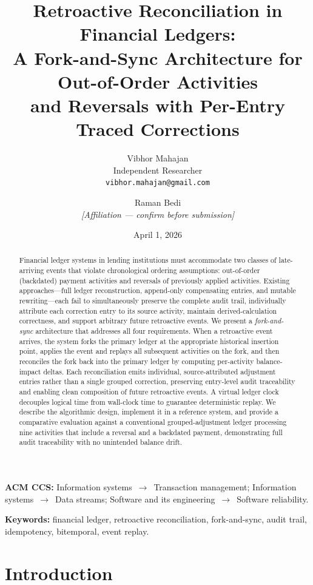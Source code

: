 \documentclass[11pt,letterpaper]{article}
\title{\textbf{Retroactive Reconciliation in Financial Ledgers:\\
A Fork-and-Sync Architecture for Out-of-Order Activities\\
and Reversals with Per-Entry Traced Corrections}}
\author{
  Vibhor Mahajan\\
  \small Independent Researcher\\
  \small \texttt{vibhor.mahajan@gmail.com}
  \and
  Raman Bedi\\
  \small \textit{[Affiliation — confirm before submission]}\\
}
\date{April 1, 2026}
\begin{document}
\maketitle

\begin{abstract}
Financial ledger systems in lending institutions must accommodate two
classes of late-arriving events that violate chronological ordering
assumptions: out-of-order (backdated) payment activities and reversals
of previously applied activities. Existing approaches---full ledger reconstruction, append-only
compensating entries, and mutable rewriting---each fail to
simultaneously preserve the complete audit trail, individually
attribute each correction entry to its source activity, maintain
derived-calculation correctness, and support arbitrary future
retroactive events. We present a \emph{fork-and-sync} architecture
that addresses all four requirements. When a retroactive
event arrives, the system forks the primary ledger at the appropriate
historical insertion point, applies the event and replays all subsequent
activities on the fork, and then reconciles the fork back into the
primary ledger by computing per-activity balance-impact deltas. Each
reconciliation emits individual, source-attributed adjustment entries
rather than a single grouped correction, preserving entry-level audit
traceability and enabling clean composition of future retroactive
events. A virtual ledger clock decouples logical time from wall-clock
time to guarantee deterministic replay. We describe the algorithmic
design, implement it in a reference system, and provide a comparative
evaluation against a conventional grouped-adjustment ledger processing
nine activities that include a reversal and a backdated payment,
demonstrating full audit traceability with no unintended balance drift.
\end{abstract}

\noindent\textbf{ACM CCS:} Information systems~$\to$~Transaction management;
Information systems~$\to$~Data streams;
Software and its engineering~$\to$~Software reliability.

\noindent\textbf{Keywords:} financial ledger, retroactive reconciliation,
fork-and-sync, audit trail, idempotency, bitemporal, event replay.

\tableofcontents
\newpage

\section{Introduction}
\end{document}
